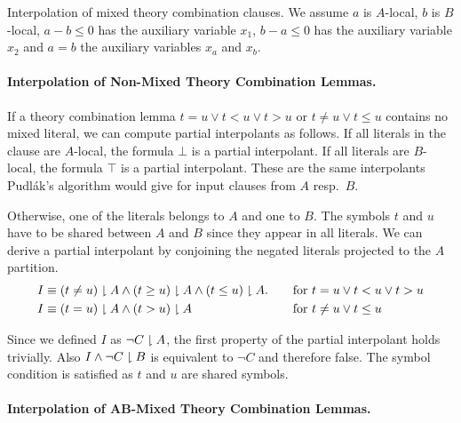 \begin{tacas}
\begin{table}[t]
  \caption{Interpolation of mixed theory combination clauses. We
    assume $a$ is $A$-local, $b$ is $B$-local, $a-b\leq 0$ has the
    auxiliary variable $x_1$, $b-a\leq 0$ has the auxiliary variable
    $x_2$ and $a=b$ the auxiliary variables $x_a$ and $x_b$. \label{tbl:iplthcomb}}
\end{table}
\end{tacas}


\begin{techreport}
\paragraph*{Interpolation of Non-Mixed Theory Combination Lemmas.}

If a theory combination lemma $t=u \lor t< u \lor t> u$ or $t \neq u \lor
t\leq u$ contains no mixed literal, we can compute partial interpolants as
follows.  If all literals in the clause are $A$-local, the formula $\bot$ is a
partial interpolant.  If all literals are $B$-local, the formula $\top$ is a
partial interpolant.  These are the same interpolants Pudl\'ak's algorithm
would give for input clauses from $A$ resp.\ $B$.

Otherwise, one of the literals belongs to $A$ and one to $B$.  The
symbols $t$ and $u$ have to be shared between $A$ and $B$ since they
appear in all literals.  We can derive a partial interpolant by
conjoining the negated literals projected to the $A$ partition.
\begin{align*}
  I &\equiv (t\neq u)\downharpoonright A \land (t\geq u)\downharpoonright A \land (t \leq u) \downharpoonright A. 
  &&\quad \mbox{for }t=u \lor t< u \lor t> u\\
  I &\equiv (t = u)\downharpoonright A \land (t > u) \downharpoonright A
  &&\quad \mbox{for }t\neq u \lor t\leq u
\end{align*}

Since we defined $I$ as $\lnot C \downharpoonright A$, the first property of the partial
interpolant holds trivially.  Also $I \land \lnot C \downharpoonright B$ is equivalent to
$\lnot C$ and therefore false.  The symbol condition is satisfied as $t$ and
$u$ are shared symbols.
\bigskip

\paragraph*{Interpolation of AB-Mixed Theory Combination Lemmas.}


\end{techreport}

